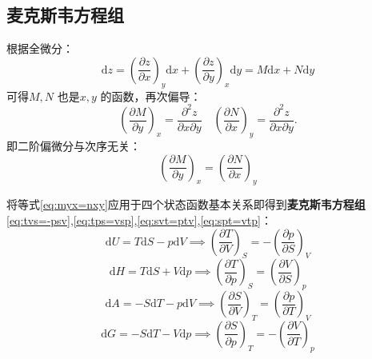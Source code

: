 \subsection{麦克斯韦方程组}%
\label{sub:麦克斯韦方程组}
\begin{notation}
根据全微分：
\begin{equation}
    \label{eq:full_deriv}
    \mathrm{d}z = \left(\frac{\partial z}{\partial x}\right)_{y}\mathrm{d}x + \left(\frac{\partial z}{\partial y}\right)_{x}\mathrm{d}y = M\mathrm{d}x + N\mathrm{d}y
\end{equation}
可得$M,N$ 也是$x,y$ 的函数，再次偏导：\[
   \left(\frac{\partial M}{\partial y}\right)_{x} = \frac{\partial^2 z}{\partial x\partial y}\quad \left(\frac{\partial N}{\partial x}\right)_{y} = \frac{\partial^2 z}{\partial x\partial y}
.\]
即二阶偏微分与次序无关：\begin{equation}
    \label{eq:myx=nxy}\boxed{
    \left(\frac{\partial M}{\partial y}\right)_{x} = \left(\frac{\partial N}{\partial x}\right)_{y}
}
\end{equation}

\end{notation}
将等式\ref{eq:myx=nxy}应用于四个状态函数基本关系即得到\textbf{麦克斯韦方程组}\ref{eq:tvs=-psv},\ref{eq:tps=vsp},\ref{eq:svt=ptv},\ref{eq:spt=vtp}：
\begin{equation}
    \label{eq:tvs=-psv}
    \mathrm{d}U = T\mathrm{d}S -p\mathrm{d}V \implies \left(\frac{\partial T}{\partial V}\right)_{S} = -\left(\frac{\partial p}{\partial S}\right)_{V}
\end{equation}
\begin{equation}
    \label{eq:tps=vsp}
    \mathrm{d}H = T\mathrm{d}S + V\mathrm{d}p \implies \left(\frac{\partial T}{\partial p}\right)_{S} = \left(\frac{\partial V}{\partial S}\right)_{p}
\end{equation}
\begin{equation}
    \label{eq:svt=ptv}
    \mathrm{d}A = -S\mathrm{d}T-p\mathrm{d}V \implies \left(\frac{\partial S}{\partial V}\right)_{T} = \left(\frac{\partial p}{\partial T}\right)_{V}
\end{equation}
\begin{equation}
    \label{eq:spt=vtp}
    \mathrm{d}G = -S\mathrm{d}T -V\mathrm{d}p \implies \left(\frac{\partial S}{\partial p}\right)_{T}=-\left(\frac{\partial V}{\partial T}\right)_{p}
\end{equation}
